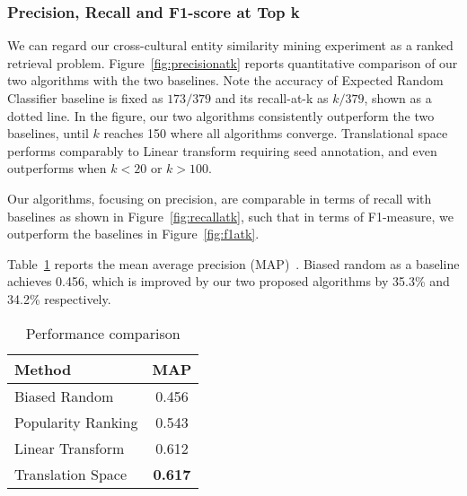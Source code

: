 \subsubsection{Precision, Recall and F1-score at Top k}

We can regard our cross-cultural entity similarity mining experiment as a ranked retrieval problem.
Figure~\ref{fig:precisionatk} reports quantitative comparison of our two algorithms with the two baselines.
Note the accuracy of
 Expected Random Classifier baseline is fixed as  $173/379$ and its recall-at-k as $k/379$, shown as a dotted line.
In the figure, our two algorithms consistently outperform the two baselines, until $k$ reaches 150 where all algorithms converge.
Translational space performs comparably to Linear transform requiring seed annotation, and even outperforms when $k<20$ or $k>100$.


Our algorithms, focusing on precision, are comparable in terms of recall with baselines as shown in
Figure~\ref{fig:recallatk},
such that in terms of F1-measure, we outperform the baselines in
Figure~\ref{fig:f1atk}. %


Table~\ref{tbl:corr} reports the mean average precision (MAP)~\cite{schutze2008introduction}. Biased random as a baseline achieves 0.456, which is improved by our two proposed algorithms by 35.3\% and 34.2\% respectively.



\begin{table}[th]
\small
\centering
\caption{Performance comparison}
\label{tbl:corr}
\begin{tabular}{l|c}
       {\bf Method}   & {\bf MAP} \\ \hline
Biased Random & 0.456 \\ \hline
Popularity Ranking & 0.543 \\ \hline
Linear Transform&  0.612 \\ \hline
Translation Space& \textbf{0.617} \\
\end{tabular}
\end{table}


